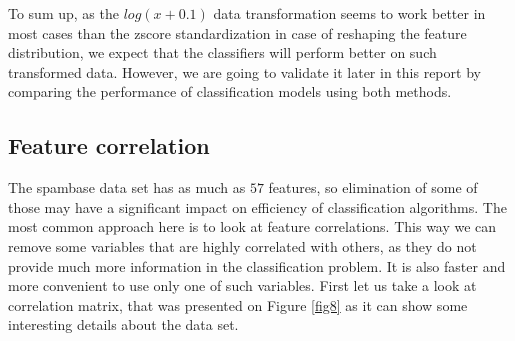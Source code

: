 \documentclass{article}\usepackage[]{graphicx}\usepackage[]{xcolor}
\begin{document}
To sum up, as the $log(x+0.1)$ data transformation seems to work better in most cases 
than the zscore standardization in case of reshaping the feature distribution, 
we expect that the classifiers will perform better on such transformed data. 
However, we are going to validate it later in this report by comparing the performance
of classification models using both methods.

\clearpage

\subsection*{Feature correlation}

The spambase data set has as much as $57$ features, so elimination of some of those may 
have a significant impact on efficiency of classification algorithms. 
The most common approach here is to look at feature correlations. This way we can 
remove some variables that are highly correlated with others, as they do not provide 
much more information in the classification problem. It is also faster and more 
convenient to use only one of such variables. First let us take a look at correlation matrix, 
that was presented on Figure \ref{fig8} as it can show some interesting details about the data set.
\end{document}
